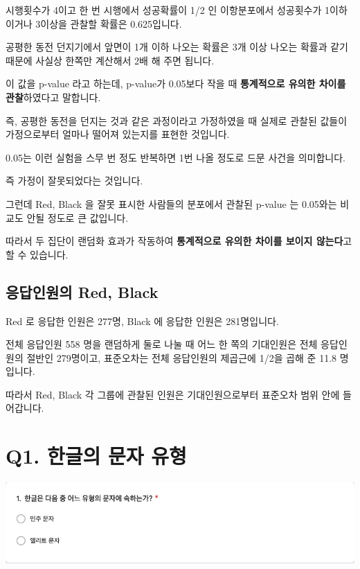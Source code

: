 \documentclass[
]{book}
\begin{document}
시행횟수가 4이고 한 번 시행에서 성공확률이 1/2 인 이항분포에서 성공횟수가 1이하이거나 3이상을 관찰할 확률은 0.625입니다.

공평한 동전 던지기에서 앞면이 1개 이하 나오는 확률은 3개 이상 나오는 확률과 같기 때문에 사실상 한쪽만 계산해서 2배 해 주면 됩니다.

이 값을 p-value 라고 하는데, p-value가 0.05보다 작을 때 \textbf{통계적으로 유의한 차이를 관찰}하였다고 말합니다.

즉, 공평한 동전을 던지는 것과 같은 과정이라고 가정하였을 때 실제로 관찰된 값들이 가정으로부터 얼마나 떨어져 있는지를 표현한 것입니다.

0.05는 이런 실험을 스무 번 정도 반복하면 1번 나올 정도로 드문 사건을 의미합니다.

즉 가정이 잘못되었다는 것입니다.

그런데 Red, Black 을 잘못 표시한 사람들의 분포에서 관찰된 p-value 는 0.05와는 비교도 안될 정도로 큰 값입니다.

따라서 두 집단이 랜덤화 효과가 작동하여 \textbf{통계적으로 유의한 차이를 보이지 않는다}고 할 수 있습니다.

\subsection{응답인원의 Red, Black}\label{uxc751uxb2f5uxc778uxc6d0uxc758-red-black-4}

Red 로 응답한 인원은 277명, Black 에 응답한 인원은 281명입니다.

전체 응답인원 558 명을 랜덤하게 둘로 나눌 때 어느 한 쪽의 기대인원은 전체 응답인원의 절반인 279명이고, 표준오차는 전체 응답인원의 제곱근에 1/2을 곱해 준 11.8 명입니다.

따라서 Red, Black 각 그룹에 관찰된 인원은 기대인원으로부터 표준오차 범위 안에 들어갑니다.

\section{Q1. 한글의 문자 유형}\label{q1.-uxd55cuxae00uxc758-uxbb38uxc790-uxc720uxd615}

\begin{flushleft}\includegraphics[width=0.75\linewidth]{./pics/Quiz210323_Q1} \end{flushleft}
\end{document}
